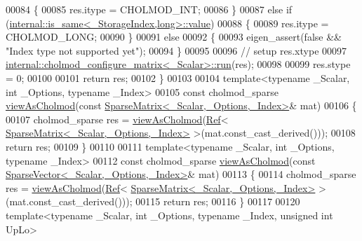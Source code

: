 \begin{DoxyCode}
00084   \{
00085     res.itype = CHOLMOD\_INT;
00086   \}
00087   \textcolor{keywordflow}{else} \textcolor{keywordflow}{if} (\hyperlink{struct_eigen_1_1internal_1_1is__same}{internal::is\_same<\_StorageIndex,long>::value})
00088   \{
00089     res.itype = CHOLMOD\_LONG;
00090   \}
00091   \textcolor{keywordflow}{else}
00092   \{
00093     eigen\_assert(\textcolor{keyword}{false} && \textcolor{stringliteral}{"Index type not supported yet"});
00094   \}
00095 
00096   \textcolor{comment}{// setup res.xtype}
00097   \hyperlink{struct_eigen_1_1internal_1_1cholmod__configure__matrix}{internal::cholmod\_configure\_matrix<\_Scalar>::run}(res);
00098   
00099   res.stype = 0;
00100   
00101   \textcolor{keywordflow}{return} res;
00102 \}
00103 
00104 \textcolor{keyword}{template}<\textcolor{keyword}{typename} \_Scalar, \textcolor{keywordtype}{int} \_Options, \textcolor{keyword}{typename} \_Index>
00105 \textcolor{keyword}{const} cholmod\_sparse \hyperlink{namespace_eigen_ac9fb9e40cfc9ddbdc7da84ee01bb7545}{viewAsCholmod}(\textcolor{keyword}{const} 
      \hyperlink{group___sparse_core___module_class_eigen_1_1_sparse_matrix}{SparseMatrix<\_Scalar,\_Options,\_Index>}& mat)
00106 \{
00107   cholmod\_sparse res = \hyperlink{namespace_eigen_ac9fb9e40cfc9ddbdc7da84ee01bb7545}{viewAsCholmod}(\hyperlink{group___core___module_class_eigen_1_1_ref}{Ref}<
      \hyperlink{group___sparse_core___module_class_eigen_1_1_sparse_matrix}{SparseMatrix<\_Scalar,\_Options,\_Index>} >(mat.const\_cast\_derived()));
00108   \textcolor{keywordflow}{return} res;
00109 \}
00110 
00111 \textcolor{keyword}{template}<\textcolor{keyword}{typename} \_Scalar, \textcolor{keywordtype}{int} \_Options, \textcolor{keyword}{typename} \_Index>
00112 \textcolor{keyword}{const} cholmod\_sparse \hyperlink{namespace_eigen_ac9fb9e40cfc9ddbdc7da84ee01bb7545}{viewAsCholmod}(\textcolor{keyword}{const} 
      \hyperlink{group___sparse_core___module_class_eigen_1_1_sparse_vector}{SparseVector<\_Scalar,\_Options,\_Index>}& mat)
00113 \{
00114   cholmod\_sparse res = \hyperlink{namespace_eigen_ac9fb9e40cfc9ddbdc7da84ee01bb7545}{viewAsCholmod}(\hyperlink{group___core___module_class_eigen_1_1_ref}{Ref}<
      \hyperlink{group___sparse_core___module_class_eigen_1_1_sparse_matrix}{SparseMatrix<\_Scalar,\_Options,\_Index>} >(mat.const\_cast\_derived()));
00115   \textcolor{keywordflow}{return} res;
00116 \}
00117 
00120 \textcolor{keyword}{template}<\textcolor{keyword}{typename} \_Scalar, \textcolor{keywordtype}{int} \_Options, \textcolor{keyword}{typename} \_Index, \textcolor{keywordtype}{unsigned} \textcolor{keywordtype}{int} UpLo>

\end{DoxyCode}
